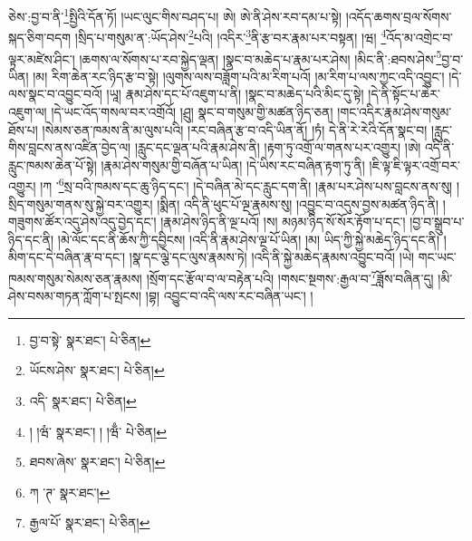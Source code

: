 ཅེས་:བྱ་བ་ནི་\footnote{བྱ་བ་སྟེ་  སྣར་ཐང་།  པེ་ཅིན། }སྤྱིའི་དོན་ཏོ། །ཡང་ལུང་གིས་བཤད་པ། ཨེ། ཨེ་ནི་ཤེས་རབ་དམ་པ་སྟེ། །འདོད་ཆགས་བྲལ་སོགས་སྐད་ཅིག་བདག །སྲིད་པ་གསུམ་ན་:ཡོད་ཤེས་\footnote{ཡོངས་ཤེས་  སྣར་ཐང་།  པེ་ཅིན། }པའི། །འདིར་\footnote{འདི་  སྣར་ཐང་།  པེ་ཅིན། }ནི་རྩ་བར་རྣམ་པར་བསྟན། །ཝ། \footnote{། །ཝཾ་  སྣར་ཐང་། ། །ཝྃ་  པེ་ཅིན། }འོད་མ་འགྲེང་བ་ལྟར་མཛེས་ཤིང་། །ཆགས་ལ་སོགས་པ་རབ་སྐྱེད་ལྡན། །སྣང་བ་མཆེད་པ་རྣམ་པར་ཤེས། །མིང་ནི་:ཐབས་ཤེས་\footnote{ཐབས་ཞེས་  སྣར་ཐང་།  པེ་ཅིན། }བྱ་བ་ཡིན། །མ། རིག་ཆེན་རང་ཉིད་རྩ་བ་སྟེ། །ལུགས་ལས་བཟློག་པའི་མ་རིག་པའོ། །མ་རིག་པ་ལས་ཀྱང་འདི་འབྱུང་། །དེ་ལས་སྣང་བ་འབྱུང་བའོ། །ཡཱ། རྣམ་ཤེས་དང་པོ་འཇུག་པ་ནི། །སྣང་བ་མཆེད་པའི་མིང་དུ་སྟེ། །དེ་ནི་སྟོང་པ་ཆེར་འཇུག་ལ། །དེ་ཡང་འོད་གསལ་བར་འགྲོའོ། །ཤྲུ། སྣང་བ་གསུམ་གྱི་མཚན་ཉིད་ཅན། །གང་འདིར་རྣམ་ཤེས་གསུམ་ཐོས་པ། །སེམས་ཅན་ཁམས་ནི་མ་ལུས་པའི། །རང་བཞིན་རྩ་བ་འདི་ཡིན་ནོ། །ཏཾ། དེ་ནི་རེ་རེའི་དོན་སྣང་བ། །རླུང་གིས་བླངས་ནས་འཛིན་བྱེད་ལ། །རླུང་དང་ལྡན་པའི་རྣམ་ཤེས་ནི། །རྟག་ཏུ་འགྲོ་ལ་གནས་པར་འགྱུར། །ཨེ། འདི་ནི་རླུང་ཁམས་ཆེན་པོ་སྟེ། །རྣམ་ཤེས་གསུམ་གྱི་བཞོན་པ་ཡིན། །དེ་ཡིས་རང་བཞིན་རྟག་ཏུ་ནི། །ཇི་ལྟ་ཇི་ལྟར་འགྲོ་བར་འགྱུར། །ཀ ་\footnote{ཀ ་ཊ་  སྣར་ཐང་། }སྲ་བའི་ཁམས་དང་ཆུ་ཉིད་དང་། །དེ་བཞིན་མེ་དང་རླུང་དག་ནི། །རྣམ་པར་ཤེས་པས་བླངས་ནས་སུ། །སྲིད་གསུམ་གནས་སུ་སྐྱེ་བར་འགྱུར། །སྨིན། འདི་ནི་ཕུང་པོ་ལྔ་རྣམས་སུ། །འབྱུང་བ་འདུས་བྱས་མཚན་ཉིད་ནི། །གཟུགས་ཚོར་འདུ་ཤེས་འདུ་བྱེད་དང་། །རྣམ་ཤེས་ཉིད་ནི་ལྔ་པའོ། །ས། མཉམ་ཉིད་སོ་སོར་རྟོག་པ་དང་། །བྱ་བ་སྒྲུབ་པ་ཉིད་དང་ནི། །མེ་ལོང་དང་ནི་ཆོས་ཀྱི་དབྱིངས། །འདི་ནི་རྣམ་ཤེས་ལྔ་པོ་ཡིན། །མ། ཡིད་ཀྱི་སྐྱེ་མཆེད་ཉིད་དང་ནི། །མིག་དང་དེ་བཞིན་རྣ་བ་དང་། །སྣ་དང་ལྕེ་དང་ལུས་རྣམས་ཏེ། །འདི་ནི་སྐྱེ་མཆེད་རྣམས་འབྱུང་བའོ། །ཡེ། གང་ཡང་ཁམས་གསུམ་སེམས་ཅན་རྣམས། །སྲོག་དང་རྩོལ་བ་ལ་བརྟེན་པའི། །གསང་སྔགས་:རྒྱལ་བ་\footnote{རྒྱལ་པོ་  སྣར་ཐང་།  པེ་ཅིན། }ཟློས་བཞིན་དུ། །མི་ཤེས་བསམ་གཏན་ཀློག་པ་སྤངས། །བྷ། འབྱུང་བ་འདི་ལས་རང་བཞིན་ཡང་། །
